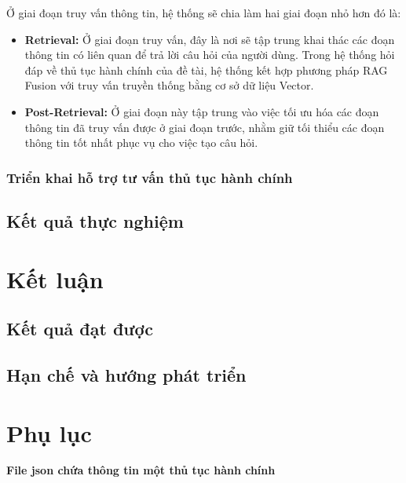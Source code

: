 \documentclass[a4paper, 12pt, openany]{book}
\begin{document}
\vspace{0.2cm}
Ở giai đoạn truy vấn thông tin, hệ thống sẽ chia làm hai giai đoạn nhỏ hơn đó là:
\begin{itemize}
    \item \textbf{Retrieval:} Ở giai đoạn truy vấn, đây là nơi sẽ tập trung khai thác các đoạn thông tin có liên quan để trả lời câu hỏi của người dùng. Trong hệ thống hỏi đáp về thủ tục hành chính của đề tài,
    hệ thống kết hợp phương pháp RAG Fusion với truy vấn truyền thống bằng cơ sở dữ liệu Vector.
    \item \textbf{Post-Retrieval:} Ở giai đoạn này tập trung vào việc tối ưu hóa các đoạn thông tin đã truy vấn được ở giai đoạn trước, nhằm giữ tối thiểu các đoạn thông tin tốt nhất phục vụ cho việc tạo câu hỏi.
\end{itemize}


\subsection{Triển khai hỗ trợ tư vấn thủ tục hành chính}

\section{Kết quả thực nghiệm}

\chapter{Kết luận}
\section{Kết quả đạt được}

\section{Hạn chế và hướng phát triển}

\printbibliography

\chapter*{Phụ lục}

\textbf{File json chứa thông tin một thủ tục hành chính}
\end{document}
